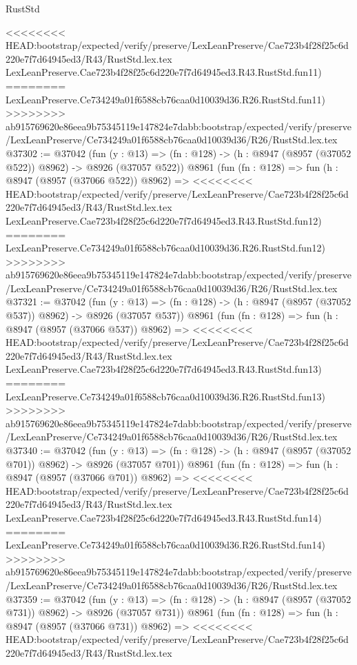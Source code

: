 \begin{lexlean}{RustStd}
\begin{coremodule}
{\begin{coremodule}
{{{{{{{{{{{{{{{{{{{{{{{{{{{{{{{{{{{{{{{<<<<<<<< HEAD:bootstrap/expected/verify/preserve/LexLeanPreserve/Cae723b4f28f25c6d220e7f7d64945ed3/R43/RustStd.lex.tex
    LexLeanPreserve.Cae723b4f28f25c6d220e7f7d64945ed3.R43.RustStd.fun11)
========
    LexLeanPreserve.Ce734249a01f6588cb76caa0d10039d36.R26.RustStd.fun11)
>>>>>>>> ab915769620e86eea9b75345119e147824e7dabb:bootstrap/expected/verify/preserve/LexLeanPreserve/Ce734249a01f6588cb76caa0d10039d36/R26/RustStd.lex.tex
@37302 := @37042
    (fun (y : @13) => (fn : @128) -> (h : @8947 (@8957 (@37052 @522)) @8962) -> @8926 (@37057 @522))
    @8961
    (fun (fn : @128) =>
    fun (h : @8947 (@8957 (@37066 @522)) @8962) =>
<<<<<<<< HEAD:bootstrap/expected/verify/preserve/LexLeanPreserve/Cae723b4f28f25c6d220e7f7d64945ed3/R43/RustStd.lex.tex
    LexLeanPreserve.Cae723b4f28f25c6d220e7f7d64945ed3.R43.RustStd.fun12)
========
    LexLeanPreserve.Ce734249a01f6588cb76caa0d10039d36.R26.RustStd.fun12)
>>>>>>>> ab915769620e86eea9b75345119e147824e7dabb:bootstrap/expected/verify/preserve/LexLeanPreserve/Ce734249a01f6588cb76caa0d10039d36/R26/RustStd.lex.tex
@37321 := @37042
    (fun (y : @13) => (fn : @128) -> (h : @8947 (@8957 (@37052 @537)) @8962) -> @8926 (@37057 @537))
    @8961
    (fun (fn : @128) =>
    fun (h : @8947 (@8957 (@37066 @537)) @8962) =>
<<<<<<<< HEAD:bootstrap/expected/verify/preserve/LexLeanPreserve/Cae723b4f28f25c6d220e7f7d64945ed3/R43/RustStd.lex.tex
    LexLeanPreserve.Cae723b4f28f25c6d220e7f7d64945ed3.R43.RustStd.fun13)
========
    LexLeanPreserve.Ce734249a01f6588cb76caa0d10039d36.R26.RustStd.fun13)
>>>>>>>> ab915769620e86eea9b75345119e147824e7dabb:bootstrap/expected/verify/preserve/LexLeanPreserve/Ce734249a01f6588cb76caa0d10039d36/R26/RustStd.lex.tex
@37340 := @37042
    (fun (y : @13) => (fn : @128) -> (h : @8947 (@8957 (@37052 @701)) @8962) -> @8926 (@37057 @701))
    @8961
    (fun (fn : @128) =>
    fun (h : @8947 (@8957 (@37066 @701)) @8962) =>
<<<<<<<< HEAD:bootstrap/expected/verify/preserve/LexLeanPreserve/Cae723b4f28f25c6d220e7f7d64945ed3/R43/RustStd.lex.tex
    LexLeanPreserve.Cae723b4f28f25c6d220e7f7d64945ed3.R43.RustStd.fun14)
========
    LexLeanPreserve.Ce734249a01f6588cb76caa0d10039d36.R26.RustStd.fun14)
>>>>>>>> ab915769620e86eea9b75345119e147824e7dabb:bootstrap/expected/verify/preserve/LexLeanPreserve/Ce734249a01f6588cb76caa0d10039d36/R26/RustStd.lex.tex
@37359 := @37042
    (fun (y : @13) => (fn : @128) -> (h : @8947 (@8957 (@37052 @731)) @8962) -> @8926 (@37057 @731))
    @8961
    (fun (fn : @128) =>
    fun (h : @8947 (@8957 (@37066 @731)) @8962) =>
<<<<<<<< HEAD:bootstrap/expected/verify/preserve/LexLeanPreserve/Cae723b4f28f25c6d220e7f7d64945ed3/R43/RustStd.lex.tex
}}}}}}}}}}}}}}}}}}}}}}}}}}}}}}}}}}}}}}}
\end{coremodule}}
\end{coremodule}
\end{lexlean}
